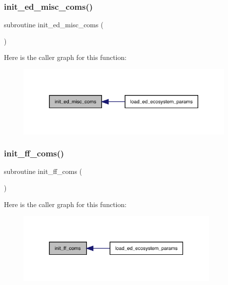 \subsubsection{\texorpdfstring{init\+\_\+ed\+\_\+misc\+\_\+coms()}{init\_ed\_misc\_coms()}}
{\footnotesize\ttfamily subroutine init\+\_\+ed\+\_\+misc\+\_\+coms (\begin{DoxyParamCaption}{ }\end{DoxyParamCaption})}

Here is the caller graph for this function\+:
\nopagebreak
\begin{figure}[H]
\begin{center}
\leavevmode
\includegraphics[width=308pt]{ed__params_8f90_a51d5dbbd804bd90f13ddd0689c6e2b74_icgraph}
\end{center}
\end{figure}
\mbox{\label{ed__params_8f90_a606f81135d58d4f3fe3498b581ce7eea}} 
\subsubsection{\texorpdfstring{init\+\_\+ff\+\_\+coms()}{init\_ff\_coms()}}
{\footnotesize\ttfamily subroutine init\+\_\+ff\+\_\+coms (\begin{DoxyParamCaption}{ }\end{DoxyParamCaption})}

Here is the caller graph for this function\+:
\nopagebreak
\begin{figure}[H]
\begin{center}
\leavevmode
\includegraphics[width=285pt]{ed__params_8f90_a606f81135d58d4f3fe3498b581ce7eea_icgraph}
\end{center}
\end{figure}
\mbox{\label{ed__params_8f90_a388838ad10e11c3962aefd4118e3c16f}} 
